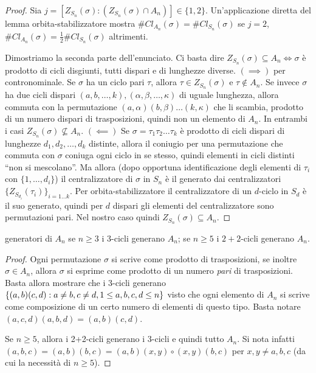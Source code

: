 \begin{proof}
    Sia $j=[Z_{S_n}(\sigma): (Z_{S_n}(\sigma) \cap A_n)] \in \{1, 2\}$. Un'applicazione diretta del lemma orbita-stabilizzatore mostra $\#Cl_{A_n}(\sigma) = \#Cl_{S_n}(\sigma)$ se $j = 2$, $\#Cl_{A_n}(\sigma) = \frac12\#Cl_{S_n}(\sigma)$ altrimenti. 
    
    Dimostriamo la seconda parte dell'enunciato. Ci basta dire $Z_{S_n}(\sigma) \subseteq A_n \iff \sigma$ è prodotto di cicli disgiunti, tutti dispari e di lunghezze diverse. $(\implies)$ per contronominale. Se $\sigma$ ha un ciclo pari $\tau$, allora $\tau \in Z_{S_n}(\sigma)$ e $\tau \notin A_n$. Se invece $\sigma$ ha due cicli dispari $(a, b, \dots, k), (\alpha, \beta, \dots, \kappa)$ di uguale lunghezza, allora commuta con la permutazione $(a, \alpha)(b, \beta) \dots (k, \kappa)$ che li scambia, prodotto di un numero dispari di trasposizioni, quindi non un elemento di $A_n$. In entrambi i casi $Z_{S_n}(\sigma) \not\subseteq A_n$.
    $(\impliedby)$ Se $\sigma = \tau_1 \tau_2 \dots \tau_k$ è prodotto di cicli dispari di lunghezze $d_1, d_2, \dots, d_k$ distinte, allora il coniugio per una permutazione che commuta con $\sigma$ coniuga ogni ciclo in se stesso, quindi elementi in cicli distinti ``non si mescolano''. Ma allora (dopo opportuna identificazione degli elementi di $\tau_i$ con $\{1, \dots, d_i\}$) il centralizzatore di $\sigma$ in $S_n$ è il generato dai centralizzatori $\{ Z_{S_{d_i}}(\tau_i) \}_{i=1\dots k}$. Per orbita-stabilizzatore il centralizzatore di un $d$-ciclo in $S_d$ è il suo generato, quindi per $d$ dispari gli elementi del centralizzatore sono permutazioni pari. Nel nostro caso quindi $Z_{S_n}(\sigma) \subseteq A_n$.
\end{proof}
\begin{proposition}{generatori di $A_n$}
    se $n\geq 3$ i $3$-cicli generano $A_n$; se $n\geq 5$ i $2+2$-cicli generano $A_n$.
\end{proposition}
\begin{proof}
    Ogni permutazione $\sigma$ si scrive come prodotto di trasposizioni, se inoltre $\sigma \in A_n$, allora $\sigma$ si esprime come prodotto di un numero \emph{pari} di trasposizioni. Basta allora mostrare che i 3-cicli generano $\left\{ (a,b)(c,d) : a \neq b, c\neq d, 1\leq a,b,c,d \leq n \right\}$ visto che ogni elemento di $A_n$ si scrive come composizione di un certo numero di elementi di questo tipo. Basta notare $(a, c, d)(a, b, d) = (a,b)(c,d)$.
    
    Se $n \ge 5$, allora i 2+2-cicli generano i 3-cicli e quindi tutto $A_n$. Si nota infatti $(a, b, c) = (a, b)(b, c) = (a, b)(x, y) \circ (x, y)(b, c)$ per $x, y \neq a, b, c$ (da cui la necessità di $n \ge 5$).
\end{proof}
